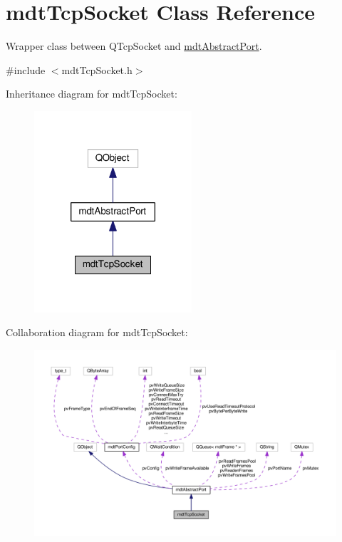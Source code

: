 \hypertarget{classmdt_tcp_socket}{\section{mdt\-Tcp\-Socket Class Reference}
\label{classmdt_tcp_socket}
}


Wrapper class between Q\-Tcp\-Socket and \hyperlink{classmdt_abstract_port}{mdt\-Abstract\-Port}.  




{\ttfamily \#include $<$mdt\-Tcp\-Socket.\-h$>$}



Inheritance diagram for mdt\-Tcp\-Socket\-:\nopagebreak
\begin{figure}[H]
\begin{center}
\leavevmode
\includegraphics[width=166pt]{classmdt_tcp_socket__inherit__graph}
\end{center}
\end{figure}


Collaboration diagram for mdt\-Tcp\-Socket\-:\nopagebreak
\begin{figure}[H]
\begin{center}
\leavevmode
\includegraphics[width=350pt]{classmdt_tcp_socket__coll__graph}
\end{center}
\end{figure}
